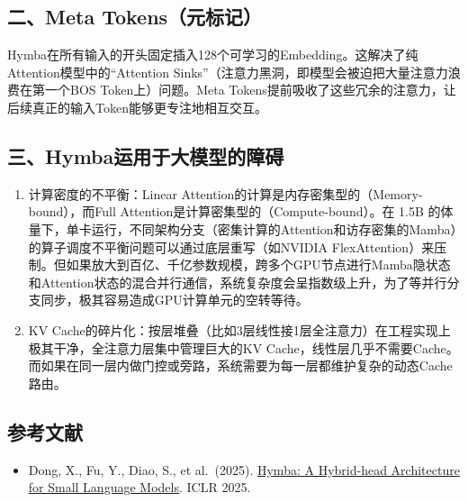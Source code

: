 \hypertarget{ux4e8cmeta-tokensux5143ux6807ux8bb0}{%
\subsection{二、Meta Tokens（元标记）}\label{ux4e8cmeta-tokensux5143ux6807ux8bb0}}

Hymba在所有输入的开头固定插入128个可学习的Embedding。这解决了纯Attention模型中的``Attention Sinks''（注意力黑洞，即模型会被迫把大量注意力浪费在第一个BOS Token上）问题。Meta Tokens提前吸收了这些冗余的注意力，让后续真正的输入Token能够更专注地相互交互。

\hypertarget{ux4e09hymbaux8fd0ux7528ux4e8eux5927ux6a21ux578bux7684ux969cux788d}{%
\subsection{三、Hymba运用于大模型的障碍}\label{ux4e09hymbaux8fd0ux7528ux4e8eux5927ux6a21ux578bux7684ux969cux788d}}

\begin{enumerate}
\def\labelenumi{\arabic{enumi}.}
\item
  计算密度的不平衡：Linear Attention的计算是内存密集型的（Memory-bound），而Full Attention是计算密集型的（Compute-bound）。在 1.5B 的体量下，单卡运行，不同架构分支（密集计算的Attention和访存密集的Mamba）的算子调度不平衡问题可以通过底层重写（如NVIDIA FlexAttention）来压制。但如果放大到百亿、千亿参数规模，跨多个GPU节点进行Mamba隐状态和Attention状态的混合并行通信，系统复杂度会呈指数级上升，为了等并行分支同步，极其容易造成GPU计算单元的空转等待。
\item
  KV Cache的碎片化：按层堆叠（比如3层线性接1层全注意力）在工程实现上极其干净，全注意力层集中管理巨大的KV Cache，线性层几乎不需要Cache。而如果在同一层内做门控或旁路，系统需要为每一层都维护复杂的动态Cache路由。
\end{enumerate}

\hypertarget{ux53c2ux8003ux6587ux732e-141}{%
\subsection{参考文献}\label{ux53c2ux8003ux6587ux732e-141}}

\begin{itemize}
\tightlist
\item
  Dong, X., Fu, Y., Diao, S., et al.~(2025). \href{https://arxiv.org/abs/2411.13676}{Hymba: A Hybrid-head Architecture for Small Language Models}. ICLR 2025.
\end{itemize}

